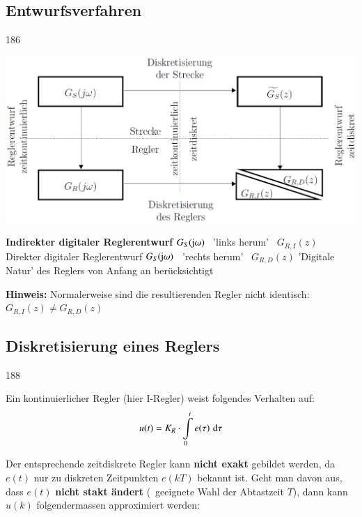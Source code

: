 \subsection{Entwurfsverfahren}{186}

\begin{minipage}[c]{0.45\columnwidth}
    \includegraphics[width=\columnwidth]{images/direkter_indirekter_reglerentwurf_digital.png}  
\end{minipage}
\hfill
\begin{minipage}[c]{0.53\columnwidth}
    \begin{outline}
        \1  \textbf{Indirekter digitaler Reglerentwurf}
            \2 $G_S(\mathrm{j} \omega)$ \textrightarrow\ 'links herum' \textrightarrow\ $G_{R,I}(z)$
        \1 Direkter digitaler Reglerentwurf
            \2 $G_S(\mathrm{j} \omega)$ \textrightarrow\ 'rechts herum' \textrightarrow\ $G_{R,D}(z)$
            \2 'Digitale Natur' des Reglers von Anfang an berücksichtigt
    \end{outline}
\end{minipage}

\textbf{Hinweis:} Normalerweise sind die resultierenden Regler nicht identisch: $G_{R,I}(z) \neq G_{R,D}(z)$


\subsection{Diskretisierung eines Reglers}{188}

Ein kontinuierlicher Regler (hier I-Regler) weist folgendes Verhalten auf:
$$ u(t) = K_R \cdot \int\limits_0^t e(\tau) \, \mathop{} \! \mathrm{d} \tau $$

Der entsprechende zeitdiskrete Regler kann \textbf{nicht exakt} gebildet werden, da $e(t)$ nur zu diskreten Zeitpunkten $e(kT)$ bekannt ist.
Geht man davon aus, dass $e(t)$ \textbf{nicht stakt ändert} (\textrightarrow\ geeignete Wahl der Abtastzeit $T$), dann kann $u(k)$
folgendermassen approximiert werden:

